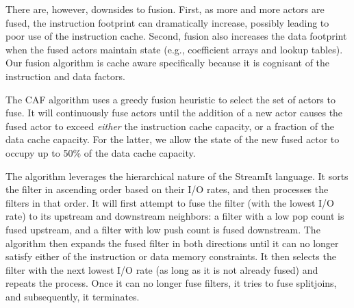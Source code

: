 There are, however, downsides to fusion. First, as more and more actors are
fused, the instruction footprint can dramatically increase, possibly
leading to poor use of the instruction cache. Second, fusion also
increases the data footprint when the fused actors maintain state
(e.g., coefficient arrays and lookup tables). Our fusion algorithm is
cache aware specifically because it is cognisant of the instruction
and data factors.

The CAF algorithm uses a greedy fusion heuristic to select the set of
actors to fuse. It will continuously fuse actors until the addition of
a new actor causes the fused actor to exceed {\it either} the instruction cache
capacity, or a fraction of the data cache capacity. For the latter, we
allow the state of the new fused actor to occupy up to 50\% of the
data cache capacity.

The algorithm  leverages the hierarchical nature of the StreamIt
language. It sorts the filter in ascending order based on their I/O
rates, and then processes the filters in that order. It will first
attempt to fuse the filter (with the lowest I/O rate) to its upstream 
and downstream neighbors: a filter with a low pop count is fused
upstream, and a filter with low push count is fused downstream. The
algorithm then expands the fused filter 
in both directions until it can no longer satisfy either of the
instruction or data memory constraints. It then selects the filter
with the next lowest I/O rate (as long as it is not already fused) and
repeats the process. Once it can no longer fuse filters, it tries to fuse
splitjoins, and subsequently, it terminates.





